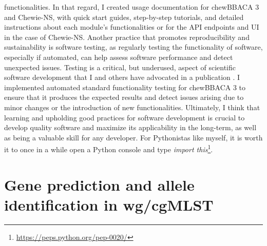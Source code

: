 functionalities. In that regard, I created usage documentation for chewBBACA 3 and Chewie-NS, with quick start guides, step-by-step tutorials, and detailed instructions about each module's functionalities or for the API endpoints and UI in the case of Chewie-NS. Another practice that promotes reproducibility and sustainability is software testing, as regularly testing the functionality of software, especially if automated, can help assess software performance and detect unexpected issues. Testing is a critical, but underused, aspect of scientific software development that I and others have advocated in a publication \cite{van_der_putten_software_2022}. I implemented automated standard functionality testing for chewBBACA 3 to ensure that it produces the expected results and detect issues arising due to minor changes or the introduction of new functionalities. Ultimately, I think that learning and upholding good practices for software development is crucial to develop quality software and maximize its applicability in the long-term, as well as being a valuable skill for any developer. For Pythonistas like myself, it is worth it to once in a while open a Python console and type \textit{import this}\footnote{\url{https://peps.python.org/pep-0020/}}.

\section{Gene prediction and allele identification in wg/cgMLST}

